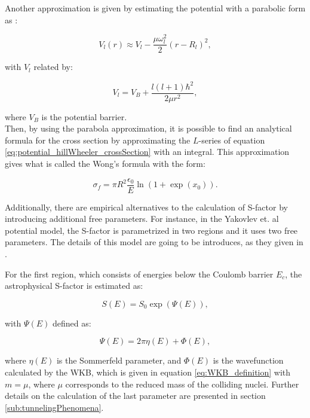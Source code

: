 \documentclass[openany]{book}
\begin{document}
Another approximation is given by estimating the potential with a parabolic form as \cite{singh_sukhvinder_kharab_2013B}:

\begin{equation}\label{eq:potential_parabolicApproximation}
	V_l(r) \approx V_l - \frac{\mu \omega^2_l}{2}(r - R_l)^2,
\end{equation}

with $V_l$ related by: 

\begin{equation}\label{eq:potential_parabolicApproximation_Vl}
	V_l  = V_B + \frac{l(l+1) \hbar^2}{2\mu r^2},
\end{equation}

where $V_B$ is the potential barrier. \\

Then, by using the parabola approximation, it is possible to find an analytical formula for the cross section by approximating the $L$-series of equation \ref{eq:potential_hillWheeler_crossSection} with an integral. This approximation gives what is called the Wong's formula with the form:

\begin{equation}\label{eq:potential_wong}
	\sigma_f = \pi R^2 \frac{\epsilon_0}{E} \ln (1 + \exp (x_0)).
\end{equation}

Additionally, there are empirical alternatives to the calculation of S-factor by introducing additional free parameters. For instance, in the Yakovlev et. al potential model, the S-factor is parametrized in two regions and it uses two free parameters.  The details of this model are going to be introduces, as they given in \cite{yakovlev_beard_gasques_wiescher_2010}. 

For the first region, which consists of energies below the Coulomb barrier $E_c$, the astrophysical S-factor is estimated as:

\begin{equation}  \label{eq:potential_Yakovlev_sfactor_belowBarrier}
	S(E) = S_0 \exp ({\Psi(E)} ),
\end{equation}

with $\Psi(E)$ defined as: 

\begin{equation}  \label{eq:potential_Yakovlev_psiWKB}
	\Psi(E) = 2\pi\eta(E) + \Phi(E),
\end{equation}

where $\eta(E)$ is the Sommerfeld parameter, and $\Phi(E)$ is the wavefunction calculated by the WKB, which is given in equation \ref{eq:WKB_definition} with $m = \mu$, where $\mu$ corresponds to the reduced mass of the colliding nuclei. Further details on the calculation of the last parameter are presented in section \ref{sub:tunnelingPhenomena}. \\
\end{document}
